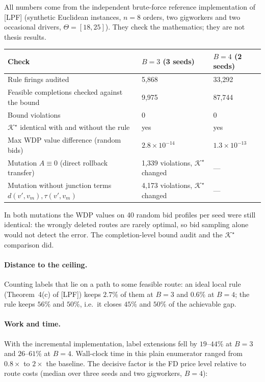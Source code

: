\documentclass[11pt]{article}
\theoremstyle{definition}
\theoremstyle{remark}
\newcommand{\Ks}{\mathcal{K}^{\star}}
\newcommand{\0}{\mathbf{0}}
\begin{document}
All numbers come from the independent brute-force reference implementation of [LPF] (synthetic
Euclidean instances, $n=8$ orders, two gigworkers and two occasional drivers, $\Theta=[18,25]$).
They check the mathematics; they are not thesis results.

\begin{center}
\begin{tabular}{@{}lll@{}}
\toprule
Check & $B=3$ (3 seeds) & $B=4$ (2 seeds) \\
\midrule
Rule firings audited & 5{,}868 & 33{,}292 \\
Feasible completions checked against the bound & 9{,}975 & 87{,}744 \\
Bound violations & 0 & 0 \\
$\Ks$ identical with and without the rule & yes & yes \\
Max WDP value difference (random bids) & $2.8\times10^{-14}$ & $1.3\times10^{-13}$ \\
\midrule
Mutation $A\equiv0$ (direct rollback transfer) & 1{,}339 violations, $\Ks$ changed & --- \\
Mutation without junction terms $d(v',v_m),\tau(v',v_m)$ & 4{,}173 violations, $\Ks$ changed & --- \\
\bottomrule
\end{tabular}
\end{center}

In both mutations the WDP values on 40 random bid profiles per seed were still identical: the
wrongly deleted routes are rarely optimal, so bid sampling alone would not detect the error. The
completion-level bound audit and the $\Ks$ comparison did.

\paragraph{Distance to the ceiling.} Counting labels that lie on a path to some feasible route:
an ideal local rule (Theorem~4(c) of [LPF]) keeps $2.7\%$ of them at $B=3$ and $0.6\%$ at $B=4$;
the rule keeps $56\%$ and $50\%$, i.e.\ it closes $45\%$ and $50\%$ of the achievable gap.

\paragraph{Work and time.} With the incremental implementation, label extensions fell by
$19$--$44\%$ at $B=3$ and $26$--$61\%$ at $B=4$. Wall-clock time in this plain enumerator ranged
from $0.8\times$ to $2\times$ the baseline. The decisive factor is the FD price level relative
to route costs (median over three seeds and two gigworkers, $B=4$):
\end{document}
